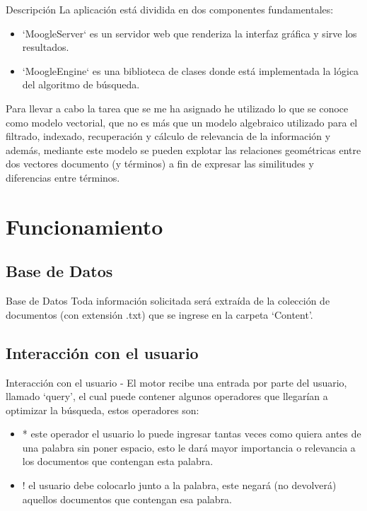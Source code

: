 \documentclass[19pt]{beamer}
\begin{document}
       \begin{frame}{Descripción}
     	La aplicación está dividida en dos componentes fundamentales:
        	\begin{itemize}
	    	\item `MoogleServer` es un servidor web que renderiza la interfaz gráfica y sirve los resultados.
	    	\item `MoogleEngine` es una biblioteca de clases donde está implementada la lógica del algoritmo de búsqueda.
        	\end{itemize}
        \end{frame}
	   \begin{frame}
	    	Para llevar a cabo la tarea que se me ha asignado he utilizado lo que se conoce como modelo vectorial, que no es más que un modelo algebraico utilizado para el filtrado, indexado, recuperación y cálculo de relevancia de la información y además, mediante este modelo se pueden explotar las relaciones geométricas entre dos vectores documento (y términos) a fin de expresar las similitudes y diferencias entre términos.
    	\end{frame}
	
	
\section{Funcionamiento}

  \subsection{Base de Datos}
  
	\begin{frame}{Base de Datos}
		Toda información solicitada será extraída de la colección de documentos (con extensión .txt) que se ingrese en la carpeta ‘Content’.
	\end{frame}
	
	\subsection{Interacción con el usuario}
	\begin{frame}{Interacción con el usuario}
		- El motor recibe una entrada por parte del usuario, llamado ‘query’, el cual puede contener algunos operadores que llegarían a optimizar la búsqueda, estos operadores son:
		\begin{itemize}
			\item * este operador el usuario lo puede ingresar tantas veces como quiera antes de una palabra sin poner espacio, esto le dará mayor importancia o relevancia a los documentos que contengan esta palabra.
	        \item  ! el usuario debe colocarlo junto a la palabra, este negará (no devolverá) aquellos documentos que contengan esa palabra.
		\end{itemize}
    \end{frame}
\end{document}
